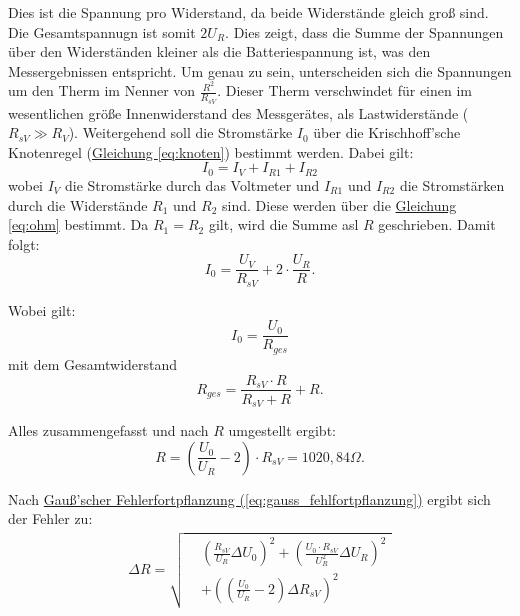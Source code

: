 Dies ist die Spannung pro Widerstand, da beide Widerstände gleich groß sind. Die Gesamtspannugn ist somit $2U_R$. Dies zeigt, dass die Summe der Spannungen über den Widerständen kleiner als die Batteriespannung ist, was den Messergebnissen entspricht. Um genau zu sein, unterscheiden sich die Spannungen um den Therm im Nenner von $\frac{R^2}{R_{sV}}$. Dieser Therm verschwindet für einen im wesentlichen größe Innenwiderstand des Messgerätes, als Lastwiderstände ($R_{sV} \gg R_V$).
Weitergehend soll die Stromstärke $I_0$ über die Krischhoff'sche Knotenregel (\hyperref[eq:knoten]{Gleichung \ref*{eq:knoten}}) bestimmt werden. Dabei gilt:
\begin{equation}
    I_0 = I_V + I_{R1} + I_{R2}
\end{equation}
wobei $I_V$ die Stromstärke durch das Voltmeter und $I_{R1}$ und $I_{R2}$ die Stromstärken durch die Widerstände $R_1$ und $R_2$ sind. Diese werden über die \hyperref[eq:ohm]{Gleichung \ref*{eq:ohm}} bestimmt. Da $R_1 = R_2$ gilt, wird die Summe asl $R$ geschrieben. Damit folgt:
\begin{equation}
    I_0 = \frac{U_V}{R_{sV}} + 2 \cdot \frac{U_R}{R}.
\end{equation}

Wobei gilt:
\begin{equation}
    I_0 = \frac{U_0}{R_{ges}}
\end{equation}
mit dem Gesamtwiderstand
\begin{equation}
    R_{ges} = \frac{R_{sV} \cdot R}{R_{sV} + R} + R.
\end{equation}

Alles zusammengefasst und nach $R$ umgestellt ergibt:
\begin{equation}
    R = \left( \frac{U_0}{U_R} - 2 \right) \cdot R_{sV} = 1020,84\Omega.
\end{equation}

Nach \hyperref[eq:gauss_fehlfortpflanzung]{Gauß'scher Fehlerfortpflanzung (\ref*{eq:gauss_fehlfortpflanzung})} ergibt sich der Fehler zu:
\begin{align}
    \Delta R = \sqrt{
        \begin{aligned}
            &\left(\frac{R_{sV}}{U_R} \Delta U_0 \right)^2 
            + \left( \frac{U_0 \cdot R_{sV}}{U_R^2} \Delta U_R \right)^2 \\
            &+ \left( \left( \frac{U_0}{U_R} - 2 \right) \Delta R_{sV} \right)^2
        \end{aligned}
    }
\end{align}


